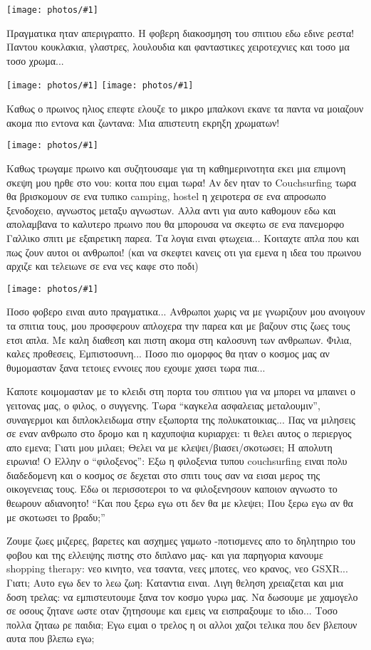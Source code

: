 \documentclass[]{book}
\newcommand\photo[1]{\noindent\texttt{[image: photos/\#1]}}
\begin{document}
\photo{83.jpg}

Πραγματικα ηταν απεριγραπτο. H φοβερη διακοσμηση του σπιτιου εδω εδινε ρεστα!
Παντου κουκλακια, γλαστρες, λουλουδια και φανταστικες χειροτεχνιες και τοσο μα τοσο χρωμα...

\photo{84.jpg}
\photo{85.jpg}

Καθως ο πρωινος ηλιος επεφτε ελουζε το μικρο μπαλκονι εκανε τα παντα να μοιαζουν ακομα πιο εντονα και ζωντανα: Μια απιστευτη εκρηξη χρωματων!

\photo{86.jpg}

Καθως τρωγαμε πρωινο και συζητουσαμε για τη καθημερινοτητα εκει μια επιμονη σκεψη μου ηρθε στο νου: κοιτα που ειμαι τωρα! Αν δεν ηταν το Couchsurfing τωρα θα βρισκομουν σε ενα τυπικο camping, hostel η χειροτερα σε ενα απροσωπο ξενοδοχειο, αγνωστος μεταξυ αγνωστων.
Αλλα αντι για αυτο καθομουν εδω και απολαμβανα το καλυτερο πρωινο που θα μπορουσα να σκεφτω σε ενα πανεμορφο Γαλλικο σπιτι με εξαιρετικη παρεα.
Τα λογια ειναι φτωχεια... Κοιταχτε απλα που και πως ζουν αυτοι οι ανθρωποι! (και να σκεφτει κανεις οτι για εμενα η ιδεα του πρωινου αρχιζε και τελειωνε σε ενα νες καφε στο ποδι)

\photo{87.jpg}

Ποσο φοβερο ειναι αυτο πραγματικα... Ανθρωποι χωρις να με γνωριζουν μου ανοιγουν τα σπιτια τους, μου προσφερουν απλοχερα την παρεα και με βαζουν στις ζωες τους ετσι απλα. Με καλη διαθεση και πιστη ακομα στη καλοσυνη των ανθρωπων.
Φιλια, καλες προθεσεις, Εμπιστοσυνη... Ποσο πιο ομορφος θα ηταν ο κοσμος μας αν θυμομασταν ξανα τετοιες εννοιες που εχουμε χασει τωρα πια...

Καποτε κοιμομασταν με το κλειδι στη πορτα του σπιτιου για να μπορει να μπαινει ο γειτονας μας, ο φιλος, ο συγγενης. Τωρα ``καγκελα ασφαλειας μεταλουμιν'', συναγερμοι και διπλοκλειδωμα στην εξωπορτα της πολυκατοικιας...
Πας να μιλησεις σε εναν ανθρωπο στο δρομο και η καχυποψια κυριαρχει: τι θελει αυτος ο περιεργος απο εμενα; Γιατι μου μιλαει; Θελει να με κλεψει/βιασει/σκοτωσει;
Η απολυτη ειρωνια! Ο Ελλην ο ``φιλοξενος'': Εξω η φιλοξενια τυπου couchsurfing ειναι πολυ διαδεδομενη και ο κοσμος σε δεχεται στο σπιτι τους σαν να εισαι μερος της οικογενειας τους. Εδω οι περισσοτεροι το να φιλοξενησουν καποιον αγνωστο το θεωρουν αδιανοητο! ``Και που ξερω εγω οτι δεν θα με κλεψει; Που ξερω εγω αν θα με σκοτωσει το βραδυ;''

Ζουμε ζωες μιζερες, βαρετες και ασχημες γαμωτο -ποτισμενες απο το δηλητηριο του φοβου και της ελλειψης πιστης στο διπλανο μας- και για παρηγορια κανουμε shopping therapy: νεο κινητο, νεα τσαντα, νεες μποτες, νεο κρανος, νεο GSXR... Γιατι;
Αυτο εγω δεν το λεω ζωη: Καταντια ειναι. Λιγη θεληση χρειαζεται και μια δοση τρελας: να εμπιστευτουμε ξανα τον κοσμο γυρω μας. Να δωσουμε με χαμογελο σε οσους ζητανε ωστε οταν ζητησουμε και εμεις να εισπραξουμε το ιδιο... Τοσο πολλα ζηταω ρε παιδια; Εγω ειμαι ο τρελος η οι αλλοι χαζοι τελικα που δεν βλεπουν αυτα που βλεπω εγω;
\end{document}
